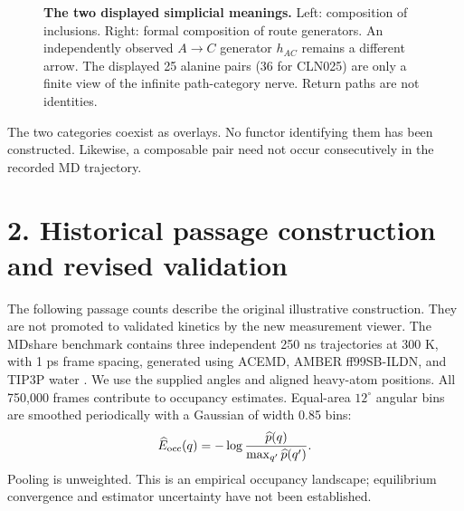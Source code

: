 \documentclass[11pt]{article}
\begin{document}
\begin{figure}[H]\centering
{}
\caption{\textbf{The two displayed simplicial meanings.}
Left: composition of inclusions. Right: formal composition of route generators.
An independently observed $A\to C$ generator $h_{AC}$ remains a different arrow.
The displayed 25 alanine pairs (36 for CLN025) are only a finite view of
the infinite path-category nerve. Return paths are not identities.}
\end{figure}
The two categories coexist as overlays. No functor identifying them has been
constructed. Likewise, a composable pair need not occur consecutively in the
recorded MD trajectory.



\newpage
\section*{2. Historical passage construction and revised validation}
The following passage counts describe the original illustrative construction.
They are not promoted to validated kinetics by the new measurement viewer.
The MDshare benchmark contains three independent 250 ns trajectories at
300 K, with 1 ps frame spacing, generated using ACEMD, AMBER ff99SB-ILDN,
and TIP3P water \cite{mdshare}. We use the supplied angles and aligned
heavy-atom positions. All 750,000 frames contribute to occupancy estimates.
Equal-area $12^\circ$ angular bins are smoothed periodically with a Gaussian
of width 0.85 bins:
\[
\widehat E_{\rm occ}(q)=-\log\frac{\widehat p(q)}{\max_{q'}\widehat p(q')}.
\]
Pooling is unweighted. This is an empirical occupancy landscape; equilibrium
convergence and estimator uncertainty have not been established.
\end{document}
